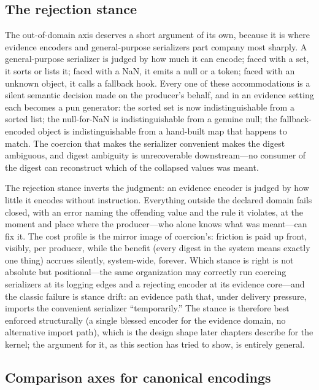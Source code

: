 \subsection{The rejection stance}\label{ch02:canon-rejection}

The out-of-domain axis deserves a short argument of its own, because
it is where evidence encoders and general-purpose serializers part
company most sharply. A general-purpose serializer is judged by how
much it can encode; faced with a set, it sorts or lists it; faced
with a NaN, it emits a null or a token; faced with an unknown
object, it calls a fallback hook. Every one of these accommodations
is a silent semantic decision made on the producer's behalf, and in
an evidence setting each becomes a pun generator: the sorted set is
now indistinguishable from a sorted list; the null-for-NaN is
indistinguishable from a genuine null; the fallback-encoded object
is indistinguishable from a hand-built map that happens to match.
The coercion that makes the serializer convenient makes the digest
ambiguous, and digest ambiguity is unrecoverable downstream---no
consumer of the digest can reconstruct which of the collapsed
values was meant.

The rejection stance inverts the judgment: an evidence encoder is
judged by how little it encodes without instruction. Everything
outside the declared domain fails closed, with an error naming the
offending value and the rule it violates, at the moment and place
where the producer---who alone knows what was meant---can fix it.
The cost profile is the mirror image of coercion's: friction is
paid up front, visibly, per producer, while the benefit (every
digest in the system means exactly one thing) accrues silently,
system-wide, forever. Which stance is right is not absolute but
positional---the same organization may correctly run coercing
serializers at its logging edges and a rejecting encoder at its
evidence core---and the classic failure is stance drift: an
evidence path that, under delivery pressure, imports the convenient
serializer ``temporarily.'' The stance is therefore best enforced
structurally (a single blessed encoder for the evidence domain, no
alternative import path), which is the design shape later chapters
describe for the kernel; the argument for it, as this section has
tried to show, is entirely general.

\subsection{Comparison axes for canonical encodings}\label{ch02:canon-axes}

